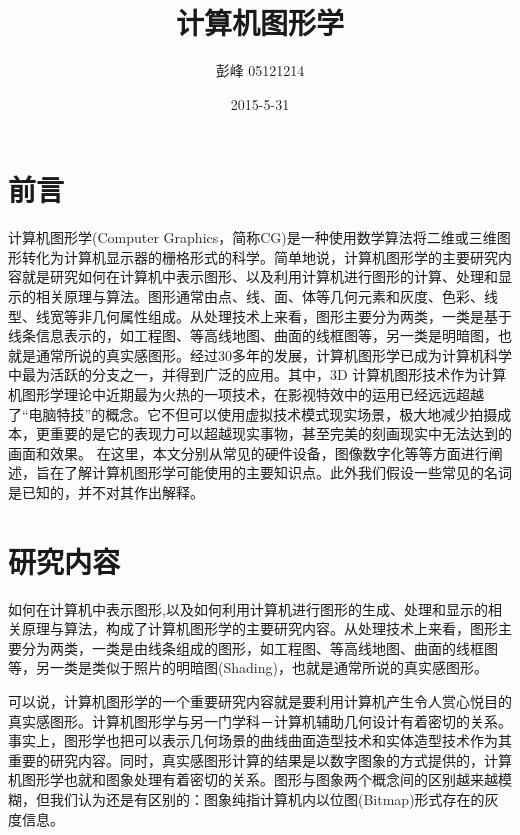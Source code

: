 \documentclass[UTF8]{article}
\begin{document}
 
\author{    彭峰     05121214   }
 \date{2015-5-31}
\title{计算机图形学}  %
\titlelabel{\S\thetitle\quad}
\maketitle%


\section{前言}
计算机图形学(Computer Graphics，简称CG)是一种使用数学算法将二维或三维图形转化为计算机显示器的栅格形式的科学。简单地说，计算机图形学的主要研究内容就是研究如何在计算机中表示图形、以及利用计算机进行图形的计算、处理和显示的相关原理与算法。图形通常由点、线、面、体等几何元素和灰度、色彩、线型、线宽等非几何属性组成。从处理技术上来看，图形主要分为两类，一类是基于线条信息表示的，如工程图、等高线地图、曲面的线框图等，另一类是明暗图，也就是通常所说的真实感图形。经过30多年的发展，计算机图形学已成为计算机科学中最为活跃的分支之一，并得到广泛的应用。其中，3D 计算机图形技术作为计算机图形学理论中近期最为火热的一项技术，在影视特效中的运用已经远远超越了“电脑特技”的概念。它不但可以使用虚拟技术模式现实场景，极大地减少拍摄成本，更重要的是它的表现力可以超越现实事物，甚至完美的刻画现实中无法达到的画面和效果。
在这里，本文分别从常见的硬件设备，图像数字化等等方面进行阐述，旨在了解计算机图形学可能使用的主要知识点。此外我们假设一些常见的名词是已知的，并不对其作出解释。

\section{研究内容}
如何在计算机中表示图形,以及如何利用计算机进行图形的生成、处理和显示的相关原理与算法，构成了计算机图形学的主要研究内容。从处理技术上来看，图形主要分为两类，一类是由线条组成的图形，如工程图、等高线地图、曲面的线框图等，另一类是类似于照片的明暗图(Shading)，也就是通常所说的真实感图形。

可以说，计算机图形学的一个重要研究内容就是要利用计算机产生令人赏心悦目的真实感图形。计算机图形学与另一门学科－计算机辅助几何设计有着密切的关系。事实上，图形学也把可以表示几何场景的曲线曲面造型技术和实体造型技术作为其重要的研究内容。同时，真实感图形计算的结果是以数字图象的方式提供的，计算机图形学也就和图象处理有着密切的关系。图形与图象两个概念间的区别越来越模糊，但我们认为还是有区别的：图象纯指计算机内以位图(Bitmap)形式存在的灰度信息。
\end{document}
